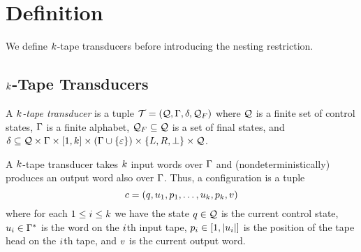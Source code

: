 
\section{Definition}

We define $k$-tape transducers before introducing the nesting restriction.


\subsection{$k$-Tape Transducers}

\begin{definition}
    A \emph{$k$-tape transducer} is a tuple
    $\mathcal{T} = \left(\mathcal{Q}, \Gamma, \delta, \mathcal{Q}_F\right)$
    where
        $\mathcal{Q}$ is a finite set of control states,
        $\Gamma$ is a finite alphabet,
        $\mathcal{Q}_F \subseteq \mathcal{Q}$ is a set of final states, and
        $\delta \subseteq
            \mathcal{Q} \times
            \Gamma \times [1, k] \times
            \left(\Gamma \cup \left\{\varepsilon\right\}\right) \times
            \left\{L, R, \bot\right\} \times \mathcal{Q}$.
\end{definition}

A $k$-tape transducer takes $k$ input words over $\Gamma$ and (nondeterministically) produces an output word also over $\Gamma$.
Thus, a configuration is a tuple
\[
    c =
    \left(
        q,
        u_1, p_1,
        \ldots,
        u_k, p_k,
        v
    \right)
\]
where for each
$1 \leq i \leq k$
we have
    the state $q \in \mathcal{Q}$ is the current control state,
    $u_i \in \Gamma^\ast$
        is the word on the $i$th input tape,
    $p_i \in [1, \left|u_i\right|]$
        is the position of the tape head on the $i$th tape, and
    $v$ is the current output word.

